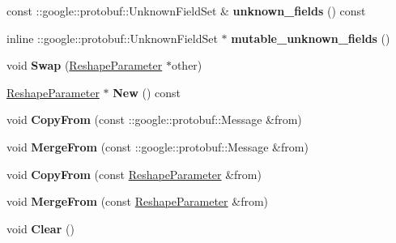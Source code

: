 \begin{DoxyCompactItemize}
const \+::google\+::protobuf\+::\+Unknown\+Field\+Set \& {\bfseries unknown\+\_\+fields} () const
\item 
\mbox{\label{classcaffe_1_1_reshape_parameter_a5810cb62226d2dc70bd752642dd727d0}} 
inline \+::google\+::protobuf\+::\+Unknown\+Field\+Set $\ast$ {\bfseries mutable\+\_\+unknown\+\_\+fields} ()
\item 
\mbox{\label{classcaffe_1_1_reshape_parameter_ae485cd6bd0abd36cf0d106f3c32a9508}} 
void {\bfseries Swap} (\mbox{\hyperlink{classcaffe_1_1_reshape_parameter}{Reshape\+Parameter}} $\ast$other)
\item 
\mbox{\label{classcaffe_1_1_reshape_parameter_a22f067e532e20c0e7d5355c199a0541d}} 
\mbox{\hyperlink{classcaffe_1_1_reshape_parameter}{Reshape\+Parameter}} $\ast$ {\bfseries New} () const
\item 
\mbox{\label{classcaffe_1_1_reshape_parameter_afd57bdc01465ccef80a1a9266c6af45a}} 
void {\bfseries Copy\+From} (const \+::google\+::protobuf\+::\+Message \&from)
\item 
\mbox{\label{classcaffe_1_1_reshape_parameter_a3190c6433d0d3a7334c741422d61c79a}} 
void {\bfseries Merge\+From} (const \+::google\+::protobuf\+::\+Message \&from)
\item 
\mbox{\label{classcaffe_1_1_reshape_parameter_a0c2af98fd7e7f4dac9ca7c57fa4a6c88}} 
void {\bfseries Copy\+From} (const \mbox{\hyperlink{classcaffe_1_1_reshape_parameter}{Reshape\+Parameter}} \&from)
\item 
\mbox{\label{classcaffe_1_1_reshape_parameter_a6e84c9ded639460355f6c0ebedca08dd}} 
void {\bfseries Merge\+From} (const \mbox{\hyperlink{classcaffe_1_1_reshape_parameter}{Reshape\+Parameter}} \&from)
\item 
\mbox{\label{classcaffe_1_1_reshape_parameter_aae214010c2d64909f4b7b8d9f0fce9f3}} 
void {\bfseries Clear} ()
\item 
\mbox{\label{classcaffe_1_1_reshape_parameter_a67faa3df02bb711899964dba2e93a6c3}} 

\end{DoxyCompactItemize}
